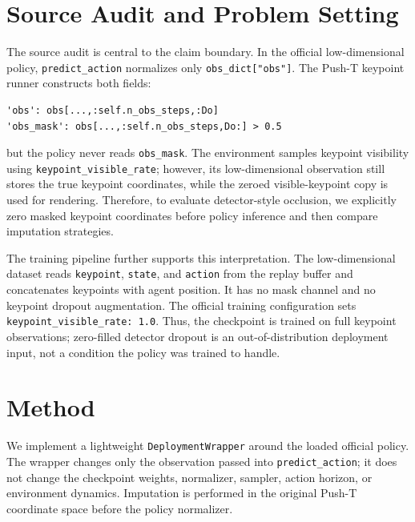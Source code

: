 \documentclass{article}
\begin{document}
\section{Source Audit and Problem Setting}

The source audit is central to the claim boundary. In the official low-dimensional policy, \texttt{predict\_action} normalizes only \texttt{obs\_dict["obs"]}. The Push-T keypoint runner constructs both fields:
\begin{verbatim}
'obs': obs[...,:self.n_obs_steps,:Do]
'obs_mask': obs[...,:self.n_obs_steps,Do:] > 0.5
\end{verbatim}
but the policy never reads \texttt{obs\_mask}. The environment samples keypoint visibility using \texttt{keypoint\_visible\_rate}; however, its low-dimensional observation still stores the true keypoint coordinates, while the zeroed visible-keypoint copy is used for rendering. Therefore, to evaluate detector-style occlusion, we explicitly zero masked keypoint coordinates before policy inference and then compare imputation strategies.

The training pipeline further supports this interpretation. The low-dimensional dataset reads \texttt{keypoint}, \texttt{state}, and \texttt{action} from the replay buffer and concatenates keypoints with agent position. It has no mask channel and no keypoint dropout augmentation. The official training configuration sets \texttt{keypoint\_visible\_rate: 1.0}. Thus, the checkpoint is trained on full keypoint observations; zero-filled detector dropout is an out-of-distribution deployment input, not a condition the policy was trained to handle.

\section{Method}

We implement a lightweight \texttt{DeploymentWrapper} around the loaded official policy. The wrapper changes only the observation passed into \texttt{predict\_action}; it does not change the checkpoint weights, normalizer, sampler, action horizon, or environment dynamics. Imputation is performed in the original Push-T coordinate space before the policy normalizer.
\end{document}
